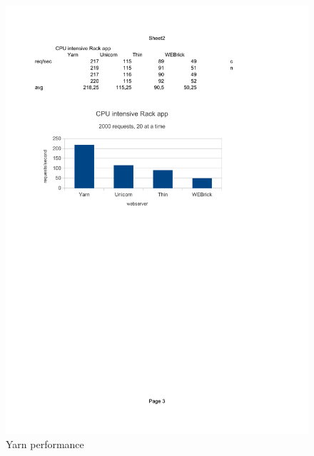 \begin{figure}[htb]
  \centering
  \includegraphics[width=1.0\textwidth]{benchmark/cpu.pdf}
  \caption{Yarn performance}
  \label{optwork}
\end{figure}
